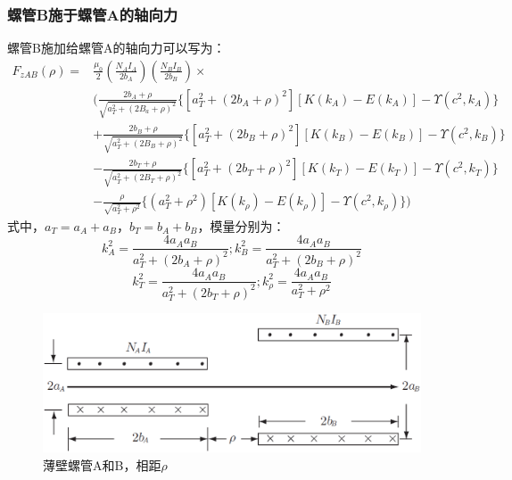 \subsubsection{螺管B施于螺管A的轴向力}
螺管B施加给螺管A的轴向力可以写为：
\begin{equation}
\begin{split}
F_{zAB}(\rho)=&\frac{\mu_0}{2}(\frac{N_A I_A}{2b_A})(\frac{N_B I_B}{2b_B})\times \\
&(\frac{2b_A+\rho}{\sqrt{a_T^2+(2B_a+\rho)^2}} \{[a_T^2+(2b_A+\rho)^2][K(k_{A})-E(k_{A})]-\Upsilon(c^2,k_A)\}\\
&+\frac{2b_B+\rho}{\sqrt{a_T^2+(2B_B+\rho)^2}} \{[a_T^2+(2b_B+\rho)^2][K(k_{B})-E(k_{B})]-\Upsilon(c^2,k_B) \}\\
&-\frac{2b_T+\rho}{\sqrt{a_T^2+(2B_T+\rho)^2}} \{[a_T^2+(2b_T+\rho)^2][K(k_{T})-E(k_{T})]-\Upsilon(c^2,k_T) \}\\
&-\frac{\rho}{\sqrt{a_T^2+\rho^2}}\{(a_T^2+\rho^2)[K(k_\rho)-E(k_\rho)]-\Upsilon(c^2,k_\rho)\})
\end{split}
\end{equation}
式中，$a_T=a_A+a_B$，$b_T=b_A+b_B$，模量分别为：
$$k_{A}^2=\frac{4a_A a_B}{a_T^2+(2b_A+\rho)^2} ; k_{B}^2=\frac{4a_A a_B}{a_T^2+(2b_B+\rho)^2} $$
$$k_{T}^2=\frac{4a_A a_B}{a_T^2+(2b_T+\rho)^2} ; k_{\rho}^2=\frac{4a_A a_B}{a_T^2+\rho^2} $$

\begin{figure}[htbp]
  \centering
 \includegraphics[scale=0.4]{chpt3/figs/fig3.7.eps}
  \caption{薄壁螺管A和B，相距$\rho$}
\end{figure}

